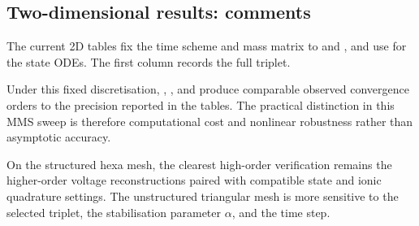 \subsection{Two-dimensional results: comments}
\label{sec:results-2d-conclusions}

The current 2D tables fix the time scheme and mass matrix to  and , and use  for the state ODEs. The first column records the full  triplet.

Under this fixed discretisation, , , and  produce comparable observed convergence orders to the precision reported in the tables. The practical distinction in this MMS sweep is therefore computational cost and nonlinear robustness rather than asymptotic accuracy.

On the structured hexa mesh, the clearest high-order verification remains the higher-order voltage reconstructions paired with compatible state and ionic quadrature settings. The unstructured triangular mesh is more sensitive to the selected  triplet, the stabilisation parameter $\alpha$, and the time step.
